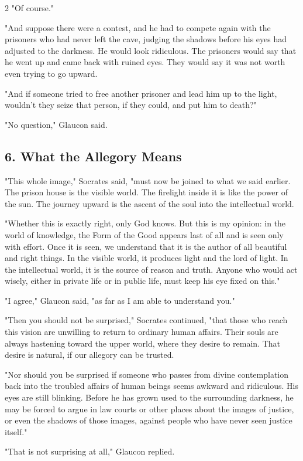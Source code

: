 \documentclass[12pt]{article}
\begin{document}
\begin{multicols}{2}
"Of course."

"And suppose there were a contest, and he had to compete again with the prisoners who had never left the cave, judging the shadows before his eyes had adjusted to the darkness. He would look ridiculous. The prisoners would say that he went up and came back with ruined eyes. They would say it was not worth even trying to go upward.

"And if someone tried to free another prisoner and lead him up to the light, wouldn't they seize that person, if they could, and put him to death?"

"No question," Glaucon said.

\subsection*{6. What the Allegory Means}
"This whole image," Socrates said, "must now be joined to what we said earlier. The prison house is the visible world. The firelight inside it is like the power of the sun. The journey upward is the ascent of the soul into the intellectual world.

"Whether this is exactly right, only God knows. But this is my opinion: in the world of knowledge, the Form of the Good appears last of all and is seen only with effort. Once it is seen, we understand that it is the author of all beautiful and right things. In the visible world, it produces light and the lord of light. In the intellectual world, it is the source of reason and truth. Anyone who would act wisely, either in private life or in public life, must keep his eye fixed on this."

"I agree," Glaucon said, "as far as I am able to understand you."

"Then you should not be surprised," Socrates continued, "that those who reach this vision are unwilling to return to ordinary human affairs. Their souls are always hastening toward the upper world, where they desire to remain. That desire is natural, if our allegory can be trusted.

"Nor should you be surprised if someone who passes from divine contemplation back into the troubled affairs of human beings seems awkward and ridiculous. His eyes are still blinking. Before he has grown used to the surrounding darkness, he may be forced to argue in law courts or other places about the images of justice, or even the shadows of those images, against people who have never seen justice itself."

"That is not surprising at all," Glaucon replied.


\end{multicols}
\end{document}
